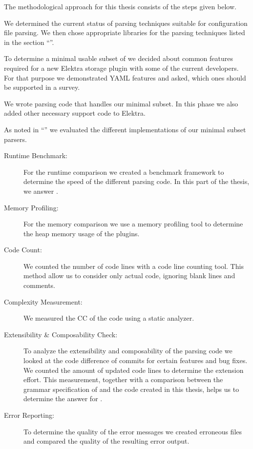 The methodological approach for this thesis consists of the steps given below.

\begin{description}[style=multiline, leftmargin=3.2cm, font=\bfseries]

  \item[Literature Review] We determined the current status of parsing techniques suitable for configuration file parsing. We then chose appropriate libraries for the parsing techniques listed in the section “”.

  \item[Discussion] To determine a minimal usable subset of  we decided about common features required for a new Elektra storage plugin with some of the current developers. For that purpose we demonstrated YAML features and asked, which ones should be supported in a survey.

  \item[Implementation] We wrote parsing code that handles our minimal  subset. In this phase we also added other necessary support code to Elektra.

  \item[Comparison] As noted in “” we evaluated the different implementations of our minimal  subset parsers.

  \begin{description}
    \item[Runtime Benchmark:] For the runtime comparison we created a benchmark framework to determine the speed of the different parsing code. In this part of the thesis, we answer .

    \item[Memory Profiling:] For the memory comparison we use a memory profiling tool to determine the heap memory usage of the  plugins.

    \item[Code Count:] We counted the number of code lines with a code line counting tool. This method allow us to consider only actual code, ignoring blank lines and comments.

    \item[Complexity Measurement:] We measured the \gls{CC} of the code using a static analyzer.

    \item[Extensibility \& Composability Check:] To analyze the extensibility and composability of the parsing code we looked at the code difference of commits for certain features and bug fixes. We counted the amount of updated code lines to determine the extension effort. This measurement, together with a comparison between the grammar specification of  and the code created in this thesis, helps us to determine the answer for .

    \item[Error Reporting:] To determine the quality of the error messages we created erroneous files and compared the quality of the resulting error output.
  \end{description}

\end{description}
